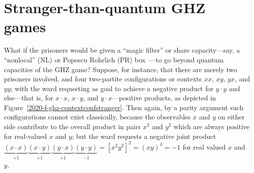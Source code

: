 \documentclass[sn-mathphys]{sn-jnl}%
\theoremstyle{thmstyleone}%
\theoremstyle{thmstyletwo}%
\theoremstyle{thmstylethree}%
\begin{document}
\section{Stranger-than-quantum GHZ games}

What if the prisoners would be given a ``magic filter'' or share capacity---say, a ``nonlocal'' (NL) or Popescu Rohrlich (PR) box~\cite{pop-rohr,svozil-krenn}---to go beyond quantum capacities of the GHZ game?
Suppose, for instance, that there are merely two prisoners involved, and four two-partite configurations or contexts
$xx$,
$xy$,
$yx$, and
$yy$; with the ward requesting as goal to achieve a negative product for $y\cdot y$
and else---that is, for $x\cdot x$, $x\cdot y$, and $y\cdot x$---positive products, as depicted in Figure~\ref{2020-f-ghz-contextconfstranger}.
Then again, by a parity argument such configurations cannot exist classically, because the observables $x$ and $y$ on either side contribute
to the overall product in pairs $x^2$ and $y^2$ which are always positive for real-valued $x$ and $y$;
but the ward requests a negative joint product
$\underbrace{(x\cdot x)}_{+1}\underbrace{(x\cdot y)}_{+1}\underbrace{(y\cdot x)}_{+1}\underbrace{(y\cdot y)}_{-1}=\left[ x^2 y^2\right]^2=(xy)^4=-1$
for real valued $x$ and $y$.
\end{document}
